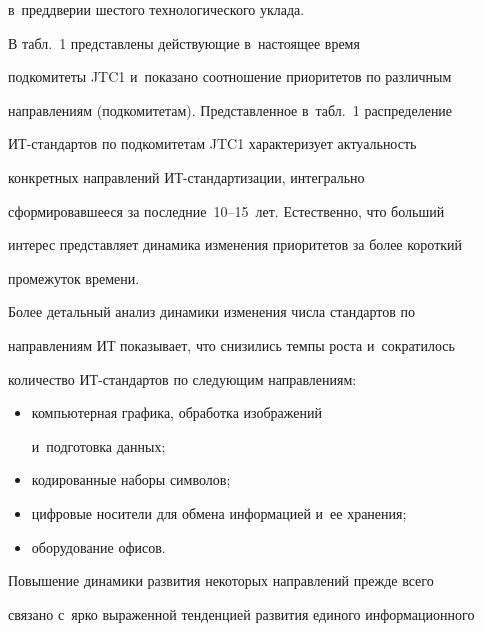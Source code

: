 в~преддверии шестого технологического уклада.


      


      В табл.~1 представлены действующие в~настоящее время 


подкомитеты JTC1 и~показано соотношение приоритетов по различным 


на\-прав\-ле\-ни\-ям (подкомитетам). Представленное в~табл.~1 распределение  


ИТ-стан\-дар\-тов по подкомитетам JTC1 характеризует актуальность 


конкретных направлений ИТ-стан\-дар\-ти\-за\-ции, интегрально 


сформировавшееся за последние~10--15~лет. Естественно, что больший 


интерес представляет динамика изменения приоритетов за более короткий 


промежуток времени. 


      


      Более детальный анализ динамики изменения числа стандартов по 


на\-прав\-ле\-ни\-ям ИТ показывает, что снизились темпы роста и~сократилось 


количество ИТ-стан\-дар\-тов по следующим направлениям:


      \begin{itemize}


      \item [(а)] компьютерная графика, обработка изображений 


и~подготовка данных;


\item [(б)] кодированные наборы символов;


\item [(в)] цифровые носители для обмена информацией и~ее хранения;


\item [(г)] оборудование офисов.


\end{itemize}


      





      


      Повышение динамики развития некоторых направлений прежде всего 


связано с~ярко выраженной тенденцией развития единого информационного 


